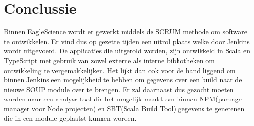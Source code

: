 \section{Conclussie}
Binnen EagleScience wordt er gewerkt middels de SCRUM methode om software te ontwikkelen. Er vind dus op gezette tijden een uitrol plaats welke door Jenkins wordt uitgevoerd. De applicaties die uitgerold worden, zijn ontwikkeld in Scala en TypeScript met gebruik van zowel externe als interne bibliotheken om ontwikkeling te vergemakkelijken. Het lijkt dan ook voor de hand liggend om binnen Jenkins een mogelijkheid te hebben om gegevens over een build naar de nieuwe SOUP module over te brengen. Er zal daarnaast dus gezocht moeten worden naar een analyse tool die het mogelijk maakt om binnen NPM(package manager voor Node projecten) en SBT(Scala Build Tool) gegevens te generenen die in een module geplaatst kunnen worden.
